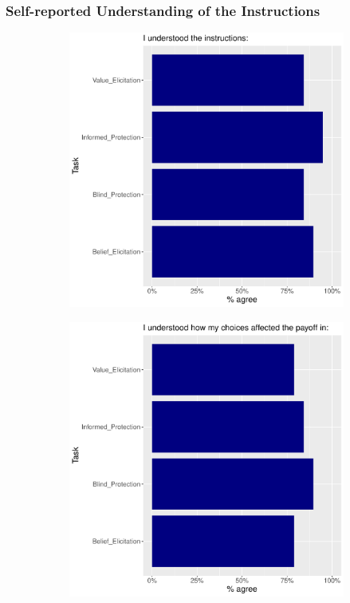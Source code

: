 \documentclass[11pt,hyperref={bookmarks=false}]{beamer}
\begin{document}
\begin{frame}
\frametitle{Self-reported Understanding of the Instructions}
\begin{figure}[h]
\begin{subfigure}{0.6\textwidth}
\includegraphics[width=\textwidth]{Graphs/Uplot1.pdf}
\end{subfigure}

\begin{subfigure}{0.6\textwidth}
\includegraphics[width=\textwidth]{Graphs/Uplot2.pdf}
\end{subfigure}
\end{figure}
\end{frame}
\end{document}
